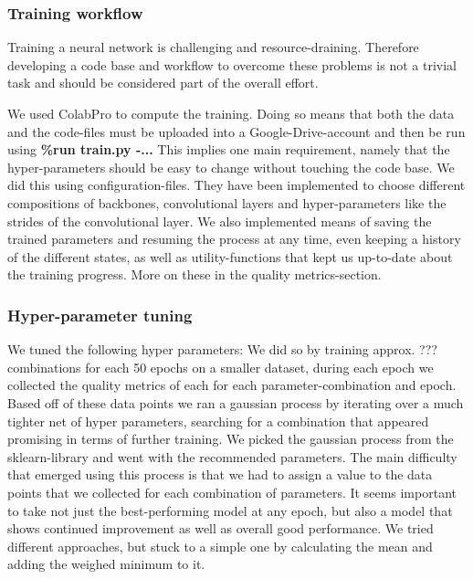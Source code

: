 \subsubsection{Training workflow}

Training a neural network is challenging and resource-draining. Therefore developing a code base and workflow to overcome these problems is not a trivial task and should be considered part of the overall effort. 

We used ColabPro to compute the training. Doing so means that both the data and the code-files must be uploaded into a Google-Drive-account and then be run using
\newline \textbf{\%run train.py -...} 
\newline This implies one main requirement, namely that the hyper-parameters should be easy to change without touching the code base. We did this using configuration-files. They have been implemented to choose different compositions of backbones, convolutional layers and hyper-parameters like the strides of the convolutional layer. We also implemented means of saving the trained parameters and resuming the process at any time, even keeping a history of the different states, as well as utility-functions that kept us up-to-date about the training progress. More on these in the quality metrics-section. 

\subsubsection{Hyper-parameter tuning}
We tuned the following hyper parameters: 
We did so by training approx. ??? combinations for each 50 epochs on a smaller dataset, during each epoch we collected the quality metrics of each for each parameter-combination and epoch. Based off of these data points we ran a gaussian process by iterating over a much tighter net of hyper parameters, searching for a combination that appeared promising in terms of further training. We picked the gaussian process from the sklearn-library and went with the recommended parameters.
The main difficulty that emerged using this process is that we had to assign a value to the data points that we collected for each combination of parameters. It seems important to take not just the best-performing model at any epoch, but also a model that shows continued improvement as well as overall good performance. We tried different approaches, but stuck to a simple one by calculating the mean and adding the weighed minimum to it. 


